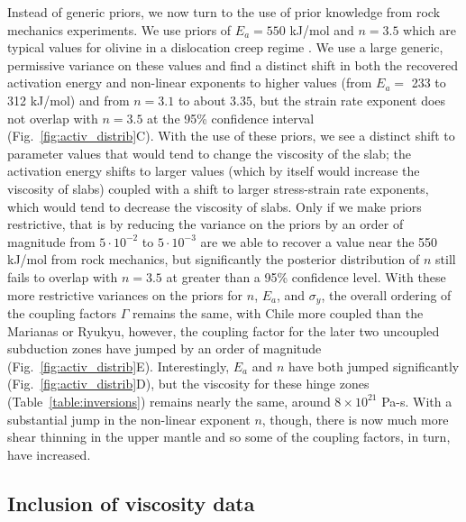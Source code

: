 \documentclass[12pt]{article}
\begin{document}
{Instead of generic priors,
we now turn to the use of prior knowledge
from rock mechanics experiments.
We use priors of $E_a=550$ kJ/mol and $n=3.5$ which are
typical values for olivine in a
dislocation creep regime \citep{karato1993rheology}.
We use a large generic, permissive variance on these values and
find a distinct shift in both the recovered activation energy and non-linear
exponents to higher values (from $E_a=$ 233 to 312 kJ/mol) and from $n=3.1$ to about $3.35$, but the strain rate  exponent does not overlap with $n=3.5$ at the 95\% confidence interval (Fig.~\ref{fig:activ_distrib}C). 
With the use of these priors, we see a distinct shift to parameter values that would tend to change the viscosity of the slab; the activation energy 
shifts to larger values (which by itself would increase the viscosity of slabs) coupled with a shift to larger stress-strain rate exponents, which would tend to decrease the viscosity of slabs. 
Only if we make priors restrictive, that is by reducing the variance on the priors by an order of magnitude from $5\cdot 10^{-2}$ to $5 \cdot 10^{-3}$ are we able to recover a value near the 550 kJ/mol from rock mechanics,
but significantly the posterior distribution of $n$ still fails to
overlap with $n=3.5$ at greater than a 95\% confidence level.
With these more restrictive variances on the priors for
$n$, $E_a$, and $\sigma_y$, the overall ordering of the coupling
factors $\Gamma$ remains the same, with Chile more coupled than the Marianas or Ryukyu,
however, the coupling factor for the later two uncoupled subduction zones have jumped by an order of magnitude (Fig.~\ref{fig:activ_distrib}E).
Interestingly, $E_a$ and $n$ have both  jumped significantly (Fig.~\ref{fig:activ_distrib}D), but the viscosity for these hinge zones (Table~\ref{table:inversions}) remains nearly the same, around $8\times10^{21}$ Pa-s. With a substantial jump in the non-linear exponent $n$, though, there is now much more shear thinning  in the upper mantle and so some of the coupling factors, in turn, have increased.

\subsection{Inclusion of viscosity data}

}
\end{document}
